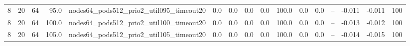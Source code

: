 \begin{tabular}{r r r r l c c c c c c c c c c r}
8 & 20 & 64 & 95.0 & nodes64\_pods512\_prio2\_util095\_timeout20 & 0.0 & 0.0 & 0.0 & 0.0 & 100.0 & 0.0 & 0.0 & -- & -0.011 & -0.011 & 100 \\
8 & 20 & 64 & 100.0 & nodes64\_pods512\_prio2\_util100\_timeout20 & 0.0 & 0.0 & 0.0 & 0.0 & 100.0 & 0.0 & 0.0 & -- & -0.013 & -0.012 & 100 \\
8 & 20 & 64 & 105.0 & nodes64\_pods512\_prio2\_util105\_timeout20 & 0.0 & 0.0 & 0.0 & 0.0 & 100.0 & 0.0 & 0.0 & -- & -0.014 & -0.015 & 100 \\
\bottomrule
\end{tabular}
